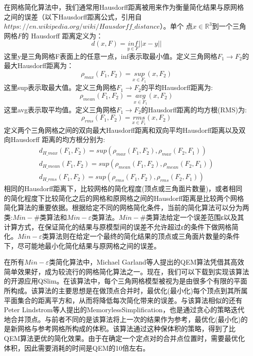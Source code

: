 在网格简化算法中，我们通常用Hausdorff距离被用来作为衡量简化结果与原网格之间的误差（以下Hausdorff距离公式，引用自$https://en.wikipedia.org/wiki/Hausdorff\_distance$）。单个
点$x\in\mathbb{R}^3$到一个三角网格$F$的 Hausdorff 距离定义为：
\begin{equation}
  d(x, F) = \underset{y\in F}{inf}||x-y||
  \label{eq:v2f-haus}
\end{equation}
这里y是三角网格F表面上的任意一点，inf表示取最小值。定义三角网格$F_1 \to F_2$的最大Hausdorff距离为：
\begin{equation}
  \rho_{max}(F_1,F_2)=\underset{x\in F_1}{sup}(x,F_2)
  \label{eq:f2f-max-haus}
\end{equation}
这里sup表示取最大值。定义三角网格$F_1 \to F_2$的平均Hausdorff距离为:
\begin{equation}
  \rho_{mean}(F_1,F_2)=\underset{x\in F_1}{avg}(x,F_2)
  \label{eq:f2f-mean-haus}
\end{equation}
这里avg表示取平均值。定义三角网格$F_1 \to F_2$的Hausdorff距离的均方根(RMS)为:
\begin{equation}
  \rho_{rms}(F_1,F_2)=\underset{x\in F_1}{rms}(x,F_2)
  \label{eq:f2f-rms-haus}
\end{equation}
定义两个三角网格之间的双向最大Hausdorff距离和双向平均Hausdorff距离以及双向Hausdorff 距离的均方根分别为:
\begin{equation}
  \begin{array}{l}
    d_{H\_max}(F_1,F_2)=sup(\rho_{max}(F_1,F_2), \rho_{max}(F_2,F_1))\\
    d_{H\_mean}(F_1,F_2)=sup(\rho_{mean}(F_1,F_2), \rho_{mean}(F_2,F_1))\\
    d_{H\_rms}(F_1,F_2)=sup(\rho_{rms}(F_1,F_2), \rho_{rms}(F_2,F_1))
  \end{array}
  \label{eq:ff-haus}
\end{equation}
相同的Hausdorff距离下，比较网格的简化程度(顶点或三角面片数量)，或者相同的简化程度下比较简化之后的网格和原网格之间的Hausdorff距离是比较两个网格简化算法的重要依据。根据给定不同的网格简化条件，当前的简化算法可以分为两类:$Min−\#$类算法和$Min−\varepsilon$类算法。$Min−\#$类算法给定一个误差范围ε以及其计算方式，在保证简化的结果与原模型间的误差不允许超过ε的条件下做网格简化。$Min−\varepsilon$类算法则在给定一个最终的简化结果的顶点或三角面片数量的条件下，尽可能地最小化简化结果与原网格之间的误差。\par
在所有$Min−\varepsilon$类简化算法中，Michael Garland等人提出的QEM算法\cite{qem1}凭借其高效简单效果好，成为较流行的网格简化算法之一。现在，我们可以下载到实现该算法的开源应用QSlim。在该算法中，每个三角网格模型被视为是由很多个有限的平面所构成。该算法的主要思想是在做顶点合并时，最优化(最小化)每个顶点到其所属平面集合的距离平方和，从而将降低每次简化带来的误差。与该算法相似的还有Peter Lindstrom等人提出的MemorylessSimplification，也是通过贪心的策略迭代地合并顶点。与前者不同的是该算法将上一次的结果作为参考，最优化(最小化)的是新网格与参考网格所构成的体积。该算法通过这种保体积的策略，得到了比QEM算法更优的简化效果。由于在确定一个定点对的合并点位置时，需要最优化体积，因此需要消耗的时间是QEM的10倍左右。\par

